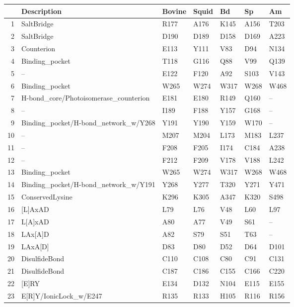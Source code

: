 \begin{table}[tbp]
\centering
\begin{tabular}{rllllll}
  \hline
\hline
 & Description & Bovine & Squid & Bd & Sp & Am \\ 
  \hline
1 & SaltBridge & R177 & A176 & K145 & A156 & T203 \\ 
  2 & SaltBridge & D190 & D189 & D158 & D169 & A223 \\ 
  3 & Counterion & E113 & Y111 & V83 & D94 & N134 \\ 
  4 & Binding\_pocket & T118 & G116 & Q88 & V99 & Q139 \\ 
  5 & -- & E122 & F120 & A92 & S103 & V143 \\ 
  6 & Binding\_pocket & W265 & W274 & W317 & W268 & W468 \\ 
  7 & H-bond\_core/Photoisomerase\_counterion & E181 & E180 & R149 & Q160 & -- \\ 
  8 & -- & I189 & F188 & Y157 & G168 & -- \\ 
  9 & Binding\_pocket/H-bond\_network\_w/Y268 & Y191 & Y190 & Y159 & W170 & -- \\ 
  10 & -- & M207 & M204 & L173 & M183 & L237 \\ 
  11 & -- & F208 & F205 & I174 & C184 & A238 \\ 
  12 & -- & F212 & F209 & V178 & V188 & L242 \\ 
  13 & Binding\_pocket & W265 & W274 & W317 & W268 & W468 \\ 
  14 & Binding\_pocket/H-bond\_network\_w/Y191 & Y268 & Y277 & T320 & Y271 & Y471 \\ 
  15 & ConservedLysine & K296 & K305 & A347 & K320 & S498 \\ 
  16 & [L]AxAD & L79 & L76 & V48 & L60 & L97 \\ 
  17 & L[A]xAD & A80 & A77 & V49 & S61 & -- \\ 
  18 & LAx[A]D & A82 & S79 & S51 & T63 & -- \\ 
  19 & LAxA[D] & D83 & D80 & D52 & D64 & D101 \\ 
  20 & DisulfideBond & C110 & C108 & C80 & C91 & C131 \\ 
  21 & DisulfideBond & C187 & C186 & C155 & C166 & C220 \\ 
  22 & [E]RY & E134 & D132 & N104 & E115 & E155 \\ 
  23 & E[R]Y/IonicLock\_w/E247 & R135 & R133 & H105 & R116 & R156 \\ 

\end{tabular}
\end{table}
